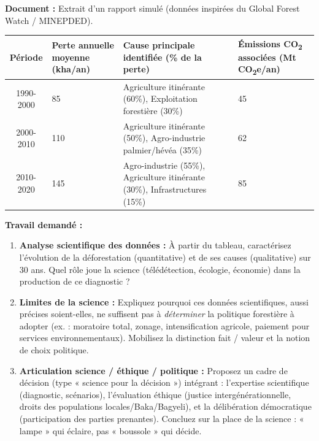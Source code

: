 \documentclass[11pt]{article}
\newcommand{\cle}[1]{{\popxbold\color{popdark}#1}}
\begin{document}
\begin{exercice}
\textbf{Document :} Extrait d'un rapport simulé (données inspirées du Global Forest Watch / MINEPDED).
\begin{center}
\begin{tabularx}{\linewidth}{|c|X|X|X|}\hline
Période & Perte annuelle moyenne (kha/an) & Cause principale identifiée (\% de la perte) & Émissions CO\textsubscript{2} associées (Mt CO\textsubscript{2}e/an) \\ \hline
1990-2000 & 85 & Agriculture itinérante (60\%), Exploitation forestière (30\%) & 45 \\ \hline
2000-2010 & 110 & Agriculture itinérante (50\%), Agro-industrie palmier/hévéa (35\%) & 62 \\ \hline
2010-2020 & 145 & Agro-industrie (55\%), Agriculture itinérante (30\%), Infrastructures (15\%) & 85 \\ \hline
\end{tabularx}
\end{center}

\textbf{Travail demandé :}
\begin{enumerate}
    \item \textbf{Analyse scientifique des données :} À partir du tableau, caractérisez l'évolution de la déforestation (quantitative) et de ses causes (qualitative) sur 30 ans. Quel rôle joue la science (télédétection, écologie, économie) dans la production de ce diagnostic ?
    \item \textbf{Limites de la science :} Expliquez pourquoi ces données scientifiques, aussi précises soient-elles, ne suffisent pas à \emph{déterminer} la politique forestière à adopter (ex. : moratoire total, zonage, intensification agricole, paiement pour services environnementaux). Mobilisez la distinction \cle{fait / valeur} et la notion de \cle{choix politique}.
    \item \textbf{Articulation science / éthique / politique :} Proposez un cadre de décision (type « science pour la décision ») intégrant : l'expertise scientifique (diagnostic, scénarios), l'évaluation éthique (justice intergénérationnelle, droits des populations locales/Baka/Bagyeli), et la délibération démocratique (participation des parties prenantes). Concluez sur la place de la science : « lampe » qui éclaire, pas « boussole » qui décide.
\end{enumerate}
\end{exercice}
\end{document}
